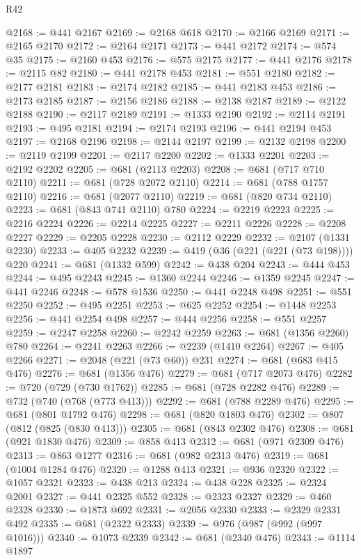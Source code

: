 \begin{lexlean}{R42}
\begin{coremodule}
@2168 := @441 @2167
@2169 := @2168 @618
@2170 := @2166 @2169
@2171 := @2165 @2170
@2172 := @2164 @2171
@2173 := @441 @2172
@2174 := @574 @35
@2175 := @2160 @453
@2176 := @575 @2175
@2177 := @441 @2176
@2178 := @2115 @82
@2180 := @441 @2178 @453
@2181 := @551 @2180
@2182 := @2177 @2181
@2183 := @2174 @2182
@2185 := @441 @2183 @453
@2186 := @2173 @2185
@2187 := @2156 @2186
@2188 := @2138 @2187
@2189 := @2122 @2188
@2190 := @2117 @2189
@2191 := @1333 @2190
@2192 := @2114 @2191
@2193 := @495 @2181
@2194 := @2174 @2193
@2196 := @441 @2194 @453
@2197 := @2168 @2196
@2198 := @2144 @2197
@2199 := @2132 @2198
@2200 := @2119 @2199
@2201 := @2117 @2200
@2202 := @1333 @2201
@2203 := @2192 @2202
@2205 := @681 (@2113 @2203)
@2208 := @681 (@717 @710 @2110)
@2211 := @681 (@728 @2072 @2110)
@2214 := @681 (@788 @1757 @2110)
@2216 := @681 (@2077 @2110)
@2219 := @681 (@820 @734 @2110)
@2223 := @681 (@843 @741 @2110) @780
@2224 := @2219 @2223
@2225 := @2216 @2224
@2226 := @2214 @2225
@2227 := @2211 @2226
@2228 := @2208 @2227
@2229 := @2205 @2228
@2230 := @2112 @2229
@2232 := @2107 (@1331 @2230)
@2233 := @405 @2232
@2239 := @419 (@36 (@221 (@221 (@73 @198)))) @220
@2241 := @681 (@1332 @599)
@2242 := @438 @204
@2243 := @444 @453
@2244 := @495 @2243
@2245 := @1360 @2244
@2246 := @1359 @2245
@2247 := @441 @2246
@2248 := @578 @1536
@2250 := @441 @2248 @498
@2251 := @551 @2250
@2252 := @495 @2251
@2253 := @625 @2252
@2254 := @1448 @2253
@2256 := @441 @2254 @498
@2257 := @444 @2256
@2258 := @551 @2257
@2259 := @2247 @2258
@2260 := @2242 @2259
@2263 := @681 (@1356 @2260) @780
@2264 := @2241 @2263
@2266 := @2239 (@1410 @2264)
@2267 := @405 @2266
@2271 := @2048 (@221 (@73 @60)) @231
@2274 := @681 (@683 @415 @476)
@2276 := @681 (@1356 @476)
@2279 := @681 (@717 @2073 @476)
@2282 := @720 (@729 (@730 @1762))
@2285 := @681 (@728 @2282 @476)
@2289 := @732 (@740 (@768 (@773 @413)))
@2292 := @681 (@788 @2289 @476)
@2295 := @681 (@801 @1792 @476)
@2298 := @681 (@820 @1803 @476)
@2302 := @807 (@812 (@825 (@830 @413)))
@2305 := @681 (@843 @2302 @476)
@2308 := @681 (@921 @1830 @476)
@2309 := @858 @413
@2312 := @681 (@971 @2309 @476)
@2313 := @863 @1277
@2316 := @681 (@982 @2313 @476)
@2319 := @681 (@1004 @1284 @476)
@2320 := @1288 @413
@2321 := @936 @2320
@2322 := @1057 @2321
@2323 := @438 @213
@2324 := @438 @228
@2325 := @2324 @2001
@2327 := @441 @2325 @552
@2328 := @2323 @2327
@2329 := @460 @2328
@2330 := @1873 @692
@2331 := @2056 @2330
@2333 := @2329 @2331 @492
@2335 := @681 (@2322 @2333)
@2339 := @976 (@987 (@992 (@997 @1016)))
@2340 := @1073 @2339
@2342 := @681 (@2340 @476)
@2343 := @1114 @1897

\end{coremodule}
\end{lexlean}
